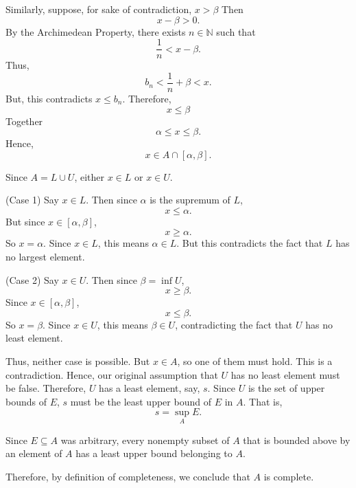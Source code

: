 \documentclass[12pt]{article}
\begin{document}
\begin{enumerate}
            Similarly, suppose, for sake of contradiction, $x > \beta$
            Then
            \[
                  x - \beta > 0.
            \]
            By the Archimedean Property, there exists $n \in \mathbb{N}$ such that
            \[
                  \frac{1}{n} < x - \beta.
            \]
            Thus,
            \[
                  b_n < \frac{1}{n} + \beta < x.
            \]
            But, this contradicts $x \leq b_n$.
            Therefore,
            \[
                  x \leq \beta
            \]
            Together
            \[
                  \alpha \leq x \leq \beta.
            \]
            Hence,
            \[
                  x \in A \cap [\alpha,\beta].
            \]

            Since $A = L \cup U$, either $x \in L$ or $x \in U$.

            (Case 1) Say $x \in L$. Then since $\alpha$ is the supremum of $L$,
            \[
                  x \leq \alpha.
            \]
            But since $x \in [\alpha, \beta]$,
            \[
                  x \geq \alpha.
            \]
            So $x = \alpha$. Since $x\in L$, this means $\alpha\in L$.
            But this contradicts the fact that $L$ has no largest element.

            (Case 2) Say $x \in U$. Then since $\beta = \inf U$,
            \[
                  x \geq \beta.
            \]
            Since $x \in [\alpha, \beta]$,
            \[
                  x \leq \beta.
            \]
            So $x = \beta$. Since $x\in U$, this means $\beta\in U$, contradicting the fact that $U$ has no least element.

            Thus, neither case is possible.
            But $x\in A$, so one of them
            must hold. This is a contradiction.
            Hence, our original assumption that $U$ has no least element must be false.
            Therefore, $U$ has a least element, say, $s$.
            Since $U$ is the set of upper bounds of $E$,
            $s$ must be the least upper bound of $E$ in $A$.
            That is,
            \[
                  s = \sup_A E.
            \]

            Since $E \subseteq A$ was arbitrary, every nonempty subset of $A$
            that is bounded above by an element of $A$ has a least upper bound belonging to $A$.

            Therefore, by definition of completeness, we conclude that $A$ is complete.
\end{enumerate}
\end{document}

